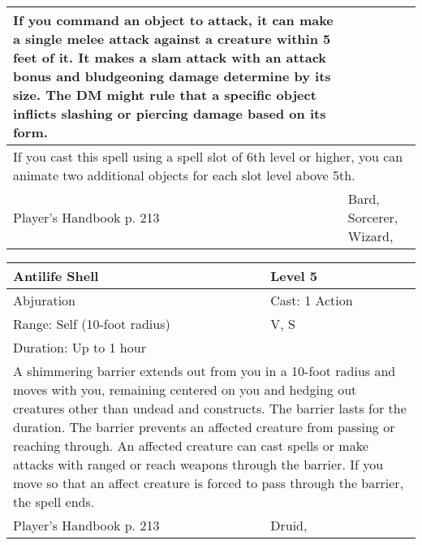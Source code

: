 \documentclass[11pt]{report}
\begin{document}
\begin{table}[H]
\begin{tabular}{||p{6cm}|p{6cm}||}
{If you command an object to attack, it can make a single melee attack against a creature within 5 feet of it. It makes a slam attack with an attack bonus and bludgeoning damage determine by its size. The DM might rule that a specific object inflicts slashing or piercing damage based on its form.}\\ \hline
		\multicolumn{2}{||p{12cm}||}{If you cast this spell using a spell slot of 6th level or higher, you can animate two additional objects for each slot level above 5th.}\\ \hline
Player's Handbook p. 213 & Bard, Sorcerer, Wizard, \\ \hline\hline
	\end{tabular}
\end{table}

\begin{table}[H]
	\begin{tabular}{||p{6cm}|p{6cm}||}
		\hline\hline
		\bf{Antilife Shell} & Level 5\\ \hline
		Abjuration & Cast: 1 Action\\ \hline
		Range: Self (10-foot radius) & V, S\\ \hline
		Duration: Up to 1 hour & \\ \hline
		\multicolumn{2}{||p{12cm}||}{A shimmering barrier extends out from you in a 10-foot radius and moves with you, remaining centered on you and hedging out creatures other than undead and constructs. 
The barrier lasts for the duration. The barrier prevents an affected creature from passing or reaching through. An affected creature can cast spells or make attacks with ranged or reach weapons through the barrier. 
If you move so that an affect creature is forced to pass through the barrier, the spell ends.}\\ \hline
Player's Handbook p. 213 & Druid, \\ \hline\hline
	\end{tabular}
\end{table}
\end{document}
